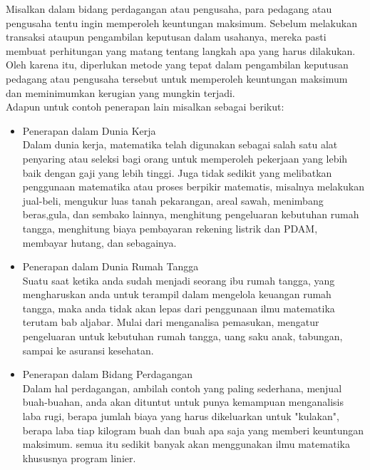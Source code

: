 \documentclass[11pt,fleqn]{book} %
\begin{document}
Misalkan dalam bidang perdagangan atau pengusaha, para pedagang atau pengusaha tentu ingin memperoleh keuntungan maksimum. Sebelum melakukan transaksi ataupun pengambilan keputusan dalam usahanya, mereka pasti membuat perhitungan yang matang tentang langkah apa yang harus dilakukan. Oleh karena itu, diperlukan metode yang tepat dalam pengambilan keputusan pedagang atau pengusaha tersebut untuk memperoleh keuntungan maksimum dan meminimumkan kerugian yang mungkin terjadi.\\

Adapun untuk contoh penerapan lain misalkan sebagai berikut:
\begin{itemize}
\item Penerapan dalam Dunia Kerja\\
Dalam dunia kerja, matematika telah digunakan sebagai salah satu alat penyaring atau seleksi bagi orang untuk memperoleh pekerjaan yang lebih baik dengan gaji yang lebih tinggi. Juga tidak sedikit yang melibatkan penggunaan matematika atau proses berpikir matematis, misalnya melakukan jual-beli, mengukur luas tanah pekarangan, areal sawah, menimbang beras,gula, dan sembako lainnya, menghitung pengeluaran kebutuhan rumah tangga, menghitung biaya pembayaran rekening listrik dan PDAM, membayar hutang, dan sebagainya.

\item Penerapan dalam Dunia Rumah Tangga\\
Suatu saat ketika anda sudah menjadi seorang ibu rumah tangga, yang mengharuskan anda untuk terampil dalam mengelola keuangan rumah tangga, maka anda tidak akan lepas dari penggunaan ilmu matematika terutam bab aljabar. Mulai dari menganalisa pemasukan, mengatur pengeluaran untuk kebutuhan rumah tangga, uang saku anak, tabungan, sampai ke asuransi kesehatan.

\item Penerapan dalam Bidang Perdagangan\\
Dalam hal perdagangan, ambilah contoh yang paling sederhana, menjual buah-buahan, anda akan dituntut untuk punya kemampuan menganalisis laba rugi, berapa jumlah biaya yang harus dikeluarkan untuk "kulakan", berapa laba tiap kilogram buah dan buah apa saja yang memberi keuntungan maksimum. semua itu sedikit banyak akan menggunakan ilmu matematika khususnya program linier.
\end{itemize}
 
\end{document}
